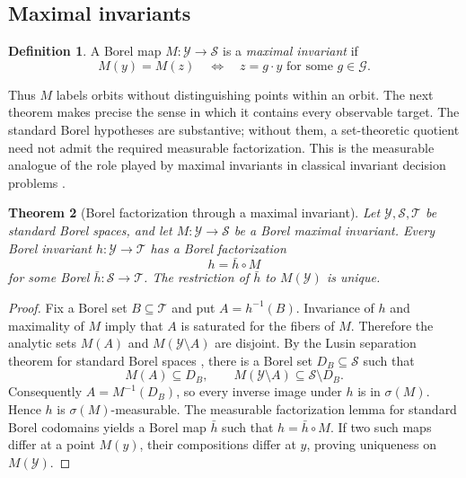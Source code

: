 \documentclass[11pt]{article}
\newtheorem{theorem}{Theorem}[section]
\theoremstyle{definition}
\newtheorem{definition}[theorem]{Definition}
\theoremstyle{remark}
\newcommand{\cY}{\mathcal Y}
\newcommand{\cS}{\mathcal S}
\newcommand{\cG}{\mathcal G}
\newcommand{\1}{\mathbf 1}
\begin{document}
\subsection{Maximal invariants}

\begin{definition}\label{def:maximal}
A Borel map \(M:\cY\to\cS\) is a \emph{maximal invariant} if
\[
  M(y)=M(z)\quad\Longleftrightarrow\quad z=g\cdot y
  \text{ for some }g\in\cG .
\]
\end{definition}

Thus \(M\) labels orbits without distinguishing points within an orbit.  The
next theorem makes precise the sense in which it contains every observable
target.  The standard Borel hypotheses are substantive; without them, a
set-theoretic quotient need not admit the required measurable factorization.
This is the measurable analogue of the role played by maximal invariants in
classical invariant decision problems \citep{eaton1989group}.

\begin{theorem}[Borel factorization through a maximal invariant]
\label{thm:factorization}
Let \(\cY,\cS,\mathcal T\) be standard Borel spaces, and let
\(M:\cY\to\cS\) be a Borel maximal invariant.  Every Borel invariant
\(h:\cY\to\mathcal T\) has a Borel factorization
\[
  h=\bar h\circ M
\]
for some Borel \(\bar h:\cS\to\mathcal T\).  The restriction of
\(\bar h\) to \(M(\cY)\) is unique.
\end{theorem}

\begin{proof}
Fix a Borel set \(B\subseteq\mathcal T\) and put
\(A=h^{-1}(B)\).  Invariance of \(h\) and maximality of \(M\) imply that
\(A\) is saturated for the fibers of \(M\).  Therefore the analytic sets
\(M(A)\) and \(M(\cY\setminus A)\) are disjoint.  By the Lusin separation
theorem for standard Borel spaces \citep[Theorem 14.7]{kechris1995classical},
there is a Borel set \(D_B\subseteq\cS\) such that
\[
  M(A)\subseteq D_B,\qquad
  M(\cY\setminus A)\subseteq\cS\setminus D_B.
\]
Consequently \(A=M^{-1}(D_B)\), so every inverse image under \(h\) is in
\(\sigma(M)\).  Hence \(h\) is \(\sigma(M)\)-measurable.  The measurable
factorization lemma for standard Borel codomains
\citep[Lemma 1.13]{kallenberg2021foundations} yields a Borel map
\(\bar h\) such that \(h=\bar h\circ M\).  If two such maps differ at a
point \(M(y)\), their compositions differ at \(y\), proving uniqueness on
\(M(\cY)\).
\end{proof}
\end{document}
